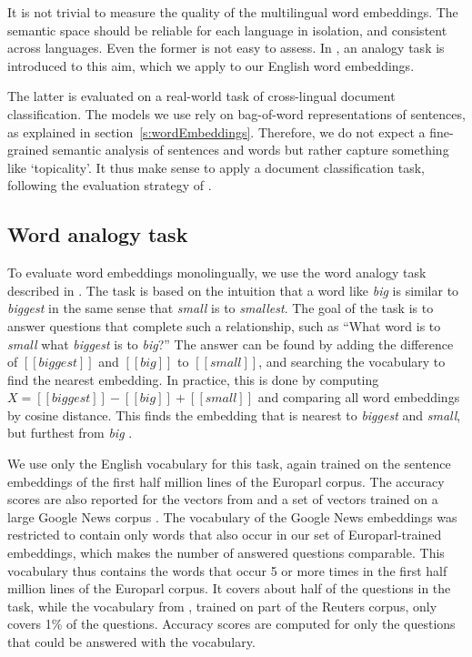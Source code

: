 

It is not trivial to measure the quality of the multilingual word embeddings. The semantic space should be reliable for each language in isolation, and consistent across languages. 
Even the former is not easy to assess. In \cite{mikolov2013efficient}, an analogy task is introduced to this aim, which we apply to our English word embeddings.

The latter is evaluated on a real-world task of cross-lingual document classification. The models we use rely on bag-of-word representations of sentences, as explained in section~\ref{s:wordEmbeddings}. Therefore, we do not expect a fine-grained semantic analysis of sentences and words but rather capture something like `topicality'. It thus make sense to apply a document classification task, following the evaluation strategy of  \cite{klementiev2012inducing,hermann2014multilingual}.


\subsection{Word analogy task}
To evaluate word embeddings monolingually, we use the word analogy task described in \cite{mikolov2013efficient}.
The task is based on the intuition that a word like \emph{big} is similar to \emph{biggest} in the same sense that \emph{small} is to \emph{smallest}.
The goal of the task is to answer questions that complete such a relationship, such as ``What word is to \emph{small} what \emph{biggest} is to \emph{big}?''
The answer can be found by adding the difference of $[\![\mathit{biggest}]\!]$ and $[\![\mathit{big}]\!]$ to $[\![\mathit{small}]\!]$, and searching the vocabulary to find the nearest embedding.
In practice, this is done by computing $X = [\![\mathit{biggest}]\!] - [\![\mathit{big}]\!]+ [\![\mathit{small}]\!]$ and comparing all word embeddings by cosine distance.
This finds the embedding that is nearest to \emph{biggest} and \emph{small}, but furthest from \emph{big} \cite{Levy2014}.

We use only the English vocabulary for this task, again trained on the sentence embeddings of the first half million lines of the Europarl corpus.
The accuracy scores are also reported for the vectors from \cite{klementiev2012inducing} and a set of vectors trained on a large Google News corpus \cite{mikolov2013efficient}.
The vocabulary of the Google News embeddings was restricted to contain only words that also occur in our set of Europarl-trained embeddings, which makes the number of answered questions comparable.
This vocabulary thus contains the words that occur 5 or more times in the first half million lines of the Europarl corpus.
It covers about half of the questions in the task, while the vocabulary from \cite{klementiev2012inducing}, trained on part of the Reuters corpus, only covers 1\% of the questions. 
Accuracy scores are computed for only the questions that could be answered with the vocabulary.


